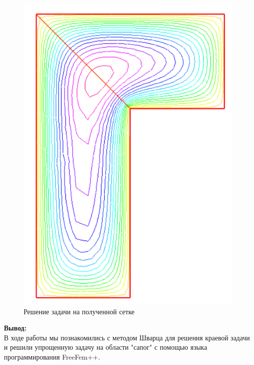 \documentclass[a4paper, 12pt]{article}%
\begin{document}
	\begin{figure}[H]
		\centering
		\includegraphics[width=0.7\linewidth]{solution.png}
		\caption{Решение задачи на полученной сетке}
	\end{figure}
	
	\textbf{Вывод: }\\
	
	В ходе работы мы познакомились с методом Шварца для решения краевой задачи и решили упрощенную задачу на области "сапог" с помощью языка программирования FreeFem++.
	
	
\end{document}
